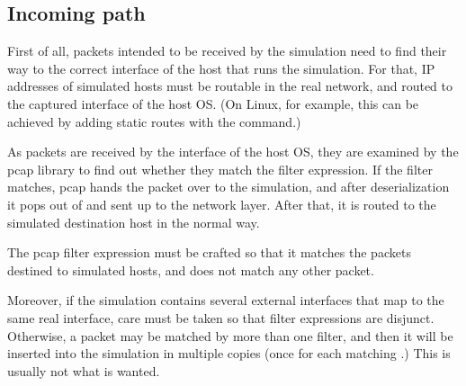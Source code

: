 \subsection*{Incoming path}

First of all, packets intended to be received by the simulation
need to find their way to the correct  interface of the host that
runs the simulation. For that, IP addresses of simulated hosts 
must be routable in the real network, and routed to the captured
interface of the host OS. (On Linux, for example, this can be achieved
by adding static routes with the  command.)

As packets are received by the interface of the host OS, they
are examined by the pcap library to find out whether they match
the filter expression. If the filter matches, pcap hands the
packet over to the simulation, and after deserialization
it pops out of  and sent up to the network
layer. After that, it is routed to the simulated destination host 
in the normal way.

The pcap filter expression must be crafted so that it matches 
the packets destined to simulated hosts, and does not match
any other packet. 

Moreover, if the simulation contains several external interfaces
that map to the same real interface, care must be taken so that
filter expressions are disjunct. Otherwise, a packet may be 
matched by more than one filter, and then it will be inserted
into the simulation in multiple copies (once for each matching 
.) This is usually not what is wanted.


